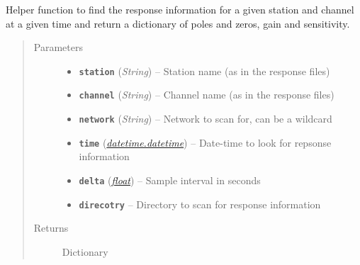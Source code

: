 \documentclass[a4paper,10pt,english]{sphinxmanual}
\begin{document}
\begin{fulllineitems}
\label{utils:mag_calc._find_resp}
Helper function to find the response information for a given station and
channel at a given time and return a dictionary of poles and zeros, gain
and sensitivity.
\begin{quote}\begin{description}
\item[{Parameters}] \leavevmode\begin{itemize}
\item {} 
\textbf{\texttt{station}} (\emph{String}) -- Station name (as in the response files)

\item {} 
\textbf{\texttt{channel}} (\emph{String}) -- Channel name (as in the response files)

\item {} 
\textbf{\texttt{network}} (\emph{String}) -- Network to scan for, can be a wildcard

\item {} 
\textbf{\texttt{time}} (\href{https://docs.python.org/library/datetime.html\#datetime.datetime}{\emph{datetime.datetime}}) -- Date-time to look for repsonse information

\item {} 
\textbf{\texttt{delta}} (\href{https://docs.python.org/library/functions.html\#float}{\emph{float}}) -- Sample interval in seconds

\item {} 
\textbf{\texttt{direcotry}} -- Directory to scan for response information

\end{itemize}

\item[{Returns}] \leavevmode
Dictionary

\end{description}\end{quote}

\end{fulllineitems}

\end{document}
